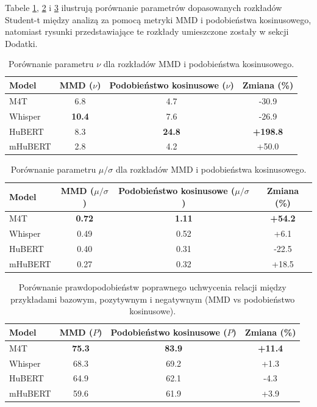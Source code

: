 Tabele \ref{tab:latent:cosCompNu}, \ref{tab:latent:cosineComparisonSeparability} i \ref{tab:latent:cosComparisonProbability} ilustrują porównanie parametrów dopasowanych rozkładów Student-t między analizą za pomocą metryki MMD i podobieństwa kosinusowego, natomiast rysunki przedstawiające te rozkłady umieszczone zostały w sekcji Dodatki.
\begin{table}[h]
\centering
\begin{tabular}{lccc}
\toprule
Model & MMD ($\nu$) & Podobieństwo kosinusowe ($\nu$) & Zmiana (\%) \\
\midrule
M4T     & 6.8  & 4.7  & -30.9 \\
Whisper & \textbf{10.4} & 7.6  & -26.9 \\
HuBERT  & 8.3  & \textbf{24.8} & \textbf{+198.8} \\
mHuBERT & 2.8  & 4.2  & +50.0 \\
\bottomrule
\end{tabular}
\caption{Porównanie parametru $\nu$ dla rozkładów MMD i podobieństwa kosinusowego.}
\label{tab:latent:cosCompNu}
\end{table}

\begin{table}[h]
\centering
\begin{tabular}{lccc}
\toprule
Model & MMD ($\mu/\sigma$) & Podobieństwo kosinusowe ($\mu/\sigma$) & Zmiana (\%) \\
\midrule
M4T     & \textbf{0.72} & \textbf{1.11} & \textbf{+54.2} \\
Whisper & 0.49 & 0.52 & +6.1 \\
HuBERT  & 0.40 & 0.31 & -22.5 \\
mHuBERT & 0.27 & 0.32 & +18.5 \\
\bottomrule
\end{tabular}
\caption{Porównanie parametru $\mu/\sigma$ dla rozkładów MMD i podobieństwa kosinusowego.}
\label{tab:latent:cosineComparisonSeparability}
\end{table}

\begin{table}[h]
\centering
\begin{tabular}{lccc}
\toprule
Model & MMD ($P$) & Podobieństwo kosinusowe ($P$) & Zmiana (\%) \\
\midrule
M4T     & \textbf{75.3} & \textbf{83.9} & \textbf{+11.4} \\
Whisper & 68.3 & 69.2 & +1.3 \\
HuBERT  & 64.9 & 62.1 & -4.3 \\
mHuBERT & 59.6 & 61.9 & +3.9 \\
\bottomrule
\end{tabular}
\caption{Porównanie prawdopodobieństw poprawnego uchwycenia relacji między przykładami bazowym, pozytywnym i negatywnym (MMD vs podobieństwo kosinusowe).}
\label{tab:latent:cosComparisonProbability}
\end{table}

